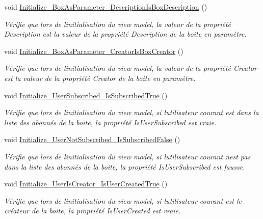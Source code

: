 \begin{DoxyCompactItemize}
void \hyperlink{class_boxes_1_1_tests_1_1_box_view_model_tests_a99d787da6ca9aa4158ec0af087079005}{Initialize\+\_\+\+Box\+As\+Parameter\+\_\+\+Description\+Is\+Box\+Description} ()
\begin{DoxyCompactList}\small\item\em Vérifie que lors de l\textquotesingle{}initialisation du view model, la valeur de la propriété {\ttfamily Description} est la valeur de la propriété {\ttfamily Description} de la boite en paramètre. \end{DoxyCompactList}\item 
void \hyperlink{class_boxes_1_1_tests_1_1_box_view_model_tests_a1319ef8f099d7b98af9c97898e6561cb}{Initialize\+\_\+\+Box\+As\+Parameter\+\_\+\+Creator\+Is\+Box\+Creator} ()
\begin{DoxyCompactList}\small\item\em Vérifie que lors de l\textquotesingle{}initialisation du view model, la valeur de la propriété {\ttfamily Creator} est la valeur de la propriété {\ttfamily Creator} de la boite en paramètre. \end{DoxyCompactList}\item 
void \hyperlink{class_boxes_1_1_tests_1_1_box_view_model_tests_a70d8f357605fc5801a7a2be6a3bbb4c9}{Initialize\+\_\+\+User\+Subscribed\+\_\+\+Is\+Subscribed\+True} ()
\begin{DoxyCompactList}\small\item\em Vérifie que lors de l\textquotesingle{}initialisation du view model, si l\textquotesingle{}utilisateur courant est dans la liste des abonnés de la boite, la propriété {\ttfamily Is\+User\+Subscribed} est vraie. \end{DoxyCompactList}\item 
void \hyperlink{class_boxes_1_1_tests_1_1_box_view_model_tests_a65f4c32b8dc0116c21ac2105a045f996}{Initialize\+\_\+\+User\+Not\+Subscribed\+\_\+\+Is\+Subscribed\+False} ()
\begin{DoxyCompactList}\small\item\em Vérifie que lors de l\textquotesingle{}initialisation du view model, si l\textquotesingle{}utilisateur courant n\textquotesingle{}est pas dans la liste des abonnés de la boite, la propriété {\ttfamily Is\+User\+Subscribed} est fausse. \end{DoxyCompactList}\item 
void \hyperlink{class_boxes_1_1_tests_1_1_box_view_model_tests_ac836dee13f611dac60d607624ccc210d}{Initialize\+\_\+\+User\+Is\+Creator\+\_\+\+Is\+User\+Created\+True} ()
\begin{DoxyCompactList}\small\item\em Vérifie que lors de l\textquotesingle{}initialisation du view model, si l\textquotesingle{}utilisateur courant est le créateur de la boite, la propriété {\ttfamily Is\+User\+Created} est vraie. \end{DoxyCompactList}\item 

\end{DoxyCompactItemize}
